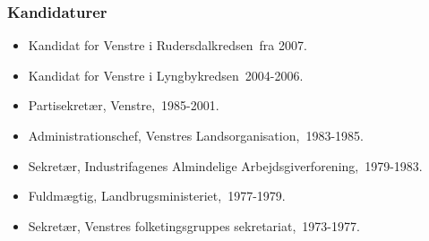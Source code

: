 \documentclass[11pt, a4paper]{awesome-cv}
\begin{document}
\begin{cvletter}
\subsubsection*{Kandidaturer}
\begin{itemize}
\item Kandidat for Venstre i Rudersdalkredsen fra 2007.
\item Kandidat for Venstre i Lyngbykredsen 2004-2006.
\end{itemize}
\begin{itemize}
\item Partisekretær, Venstre, 1985-2001.
\item Administrationschef, Venstres Landsorganisation, 1983-1985.
\item Sekretær, Industrifagenes Almindelige Arbejdsgiverforening, 1979-1983.
\item Fuldmægtig, Landbrugsministeriet, 1977-1979.
\item Sekretær, Venstres folketingsgruppes sekretariat, 1973-1977.
\end{itemize}
\end{cvletter}
\end{document}
